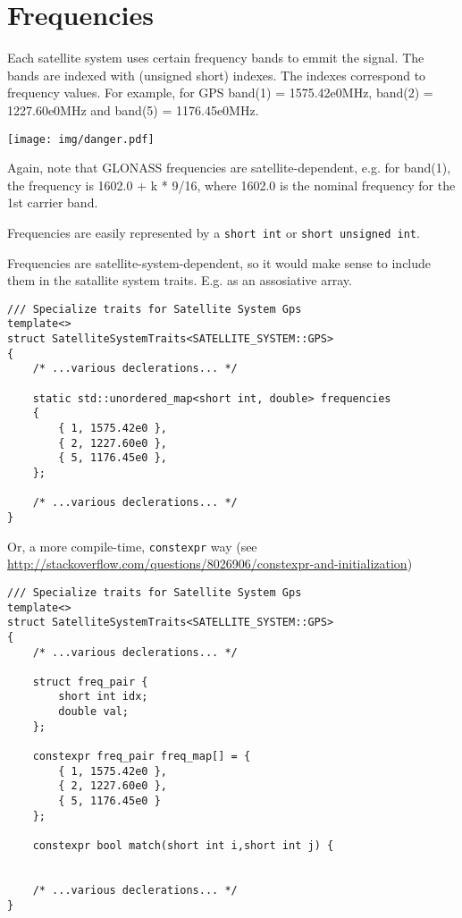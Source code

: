 \documentclass{article}
\newcommand{\alertwarningbox}[1]{
    \centering
    \colorbox{warningbackground}{\parbox{400pt} {
            \vskip 10pt
            \begin{floatingfigure}[l]{50pt}
                \texttt{[image: img/danger.pdf]}
            \end{floatingfigure}
            #1
            \vskip 10pt
        }
    }
}
\begin{document}
\section{Frequencies}

Each satellite system uses certain frequency bands to emmit the signal.
The bands are indexed with (unsigned short) indexes. The indexes correspond to
frequency values. For example, for GPS band(1) = 1575.42e0MHz, band(2) = 1227.60e0MHz
and band(5) = 1176.45e0MHz.

\alertwarningbox{Again, note that GLONASS frequencies
are satellite-dependent, e.g. for band(1), the frequency is 1602.0 + k * 9/16,
where 1602.0 is the nominal frequency for the 1st carrier band.}

Frequencies are easily represented by a \texttt{short int} or \texttt{short unsigned int}.

Frequencies are satellite-system-dependent, so it would make sense to include them
in the satallite system traits. E.g. as an assosiative array.

\begin{lstlisting}
/// Specialize traits for Satellite System Gps
template<>
struct SatelliteSystemTraits<SATELLITE_SYSTEM::GPS>
{
    /* ...various declerations... */
    
    static std::unordered_map<short int, double> frequencies
    {
        { 1, 1575.42e0 },
        { 2, 1227.60e0 },
        { 5, 1176.45e0 },
    };
    
    /* ...various declerations... */
}
\end{lstlisting}

Or, a more compile-time, \texttt{constexpr} way (see \url{http://stackoverflow.com/questions/8026906/constexpr-and-initialization})

\begin{lstlisting}
/// Specialize traits for Satellite System Gps
template<>
struct SatelliteSystemTraits<SATELLITE_SYSTEM::GPS>
{
    /* ...various declerations... */
    
    struct freq_pair {
        short int idx;
        double val;
    };

    constexpr freq_pair freq_map[] = {
        { 1, 1575.42e0 },
        { 2, 1227.60e0 },
        { 5, 1176.45e0 }
    };
    
    constexpr bool match(short int i,short int j) {
        

    /* ...various declerations... */
}
\end{lstlisting}
\end{document}
